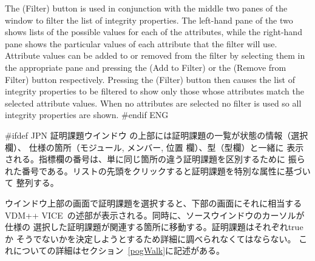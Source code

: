 \documentclass[\pformat,12pt]{article}
\newcommand{\vdmslpp}{VDM-SL}
\newcommand{\vdmslpp}{VDM++}
\renewcommand{\vdmslpp}{VDM++ VICE}
\newcommand{\guicmd}[1]{{\sf #1}}
\newcommand{\guicmd}[1]{{\gt #1}}
\begin{document}
The
(\guicmd{Filter}) button is used in conjunction with the middle two
panes of the window to filter the list of integrity properties. The
left-hand pane of the two shows lists of the possible values for each
of 
the attributes, while the right-hand pane shows the particular values
of each attribute that the filter will use. Attribute values can be
added to or removed from the filter by selecting them in the
appropriate pane and pressing the 
(\guicmd{Add to Filter}) or the 
(\guicmd{Remove from Filter}) button respectively. Pressing the 
(\guicmd{Filter}) button then causes the list of integrity properties
to be filtered to show only those whose attributes match the selected
attribute values. When no attributes are selected no filter is used so
all integrity properties are shown.
#endif ENG

#ifdef JPN
\guicmd{証明課題ウインドウ} の上部には証明課題の一覧が状態の情報（\guicmd{選択}欄）、
仕様の箇所（\guicmd{モジュール}, \guicmd{メンバー}, \guicmd{位置} 欄）、型（\guicmd{型}欄）と一緒に
表示される。\guicmd{指標}欄の番号は、単に同じ箇所の違う証明課題を区別するために
振られた番号である。リストの先頭をクリックすると証明課題を特別な属性に基づいて
整列する。

ウインドウ上部の画面で証明課題を選択すると、下部の画面にそれに相当する
\vdmslpp\ の述部が表示される。同時に、ソースウインドウのカーソルが仕様の
選択した証明課題が関連する箇所に移動する。証明課題はそれぞれtrueか
そうでないかを決定しようとするため詳細に調べられなくてはならない。
これについての詳細はセクション~\ref{pogWalk}に記述がある。
\end{document}
